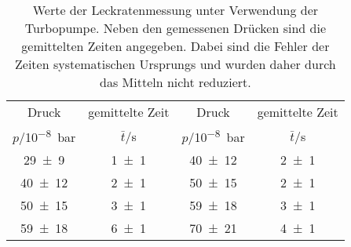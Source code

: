 \begin{table}[!h]
	\centering
	\begin{tabular}{cccc}
		\toprule
		Druck & gemittelte Zeit & Druck & gemittelte Zeit\\
		$p$/\si{10^{-8}bar} & $\bar{t}$/\si{s} & $p$/\si{10^{-8}bar} & $\bar{t}$/\si{s}\\
\midrule
		\num{29(9)} & \num{1(1)} & \num{40(12)} & \num{2(1)}\\
		\num{40(12)} & \num{2(1)} & \num{50(15)} & \num{2(1)}\\
		\num{50(15)} & \num{3(1)} & \num{59(18)} & \num{3(1)}\\
		\num{59(18)} & \num{6(1)} & \num{70(21)} & \num{4(1)}\\
		\bottomrule
	\end{tabular}
	\caption{Werte der Leckratenmessung unter Verwendung der Turbopumpe.
                        Neben den gemessenen Drücken sind die gemittelten Zeiten angegeben. 
                        Dabei sind die Fehler der Zeiten systematischen Ursprungs und wurden 
                        daher durch das Mitteln nicht reduziert. \label{tab:}}
\end{table}
